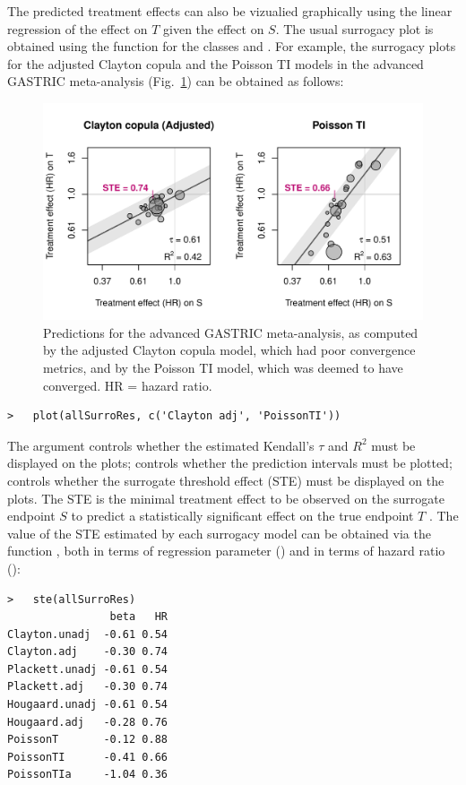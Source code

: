 \documentclass[]{scrartcl}\usepackage[]{graphicx}\usepackage[]{color}
\begin{document}
{{The predicted treatment effects can also be vizualied graphically
  using the linear regression of the effect on $T$ given the effect on $S$.
The usual surrogacy plot is obtained using the function 
  for the classes  and .
For example, the surrogacy plots
  for the adjusted Clayton copula and the Poisson TI models
  in the advanced GASTRIC meta-analysis (Fig.~\ref{fig:predictions})
  can be obtained as follows:
\begin{figure}
\includegraphics[width=\textwidth]{./predictions-1} \caption[Predictions for the advanced GASTRIC meta-analysis, as computed by the adjusted Clayton copula model, which had poor convergence metrics, and by the Poisson TI model, which was deemed to have converged]{Predictions for the advanced GASTRIC meta-analysis, as computed by the adjusted Clayton copula model, which had poor convergence metrics, and by the Poisson TI model, which was deemed to have converged. HR = hazard ratio.}\label{fig:predictions}
\end{figure}
\begin{lstlisting}
>   plot(allSurroRes, c('Clayton adj', 'PoissonTI'))
\end{lstlisting}


The argument  controls whether the estimated
  Kendall's $\tau$ and $R^2$ must be displayed on the plots;
   controls whether the prediction intervals
  must be plotted;
   controls whether the surrogate threshold effect (STE)
  must be displayed on the plots.
The STE is the minimal treatment effect to be observed 
  on the surrogate endpoint $S$ to predict a statistically significant effect
  on the true endpoint $T$ \citep{BurzykowskiBuyse06}.
The value of the STE estimated by each surrogacy model can be obtained
  via the function ,
  both in terms of regression parameter ()
  and in terms of hazard ratio ():
\begin{lstlisting}
>   ste(allSurroRes)
                beta   HR
Clayton.unadj  -0.61 0.54
Clayton.adj    -0.30 0.74
Plackett.unadj -0.61 0.54
Plackett.adj   -0.30 0.74
Hougaard.unadj -0.61 0.54
Hougaard.adj   -0.28 0.76
PoissonT       -0.12 0.88
PoissonTI      -0.41 0.66
PoissonTIa     -1.04 0.36
\end{lstlisting}


}}
\end{document}
